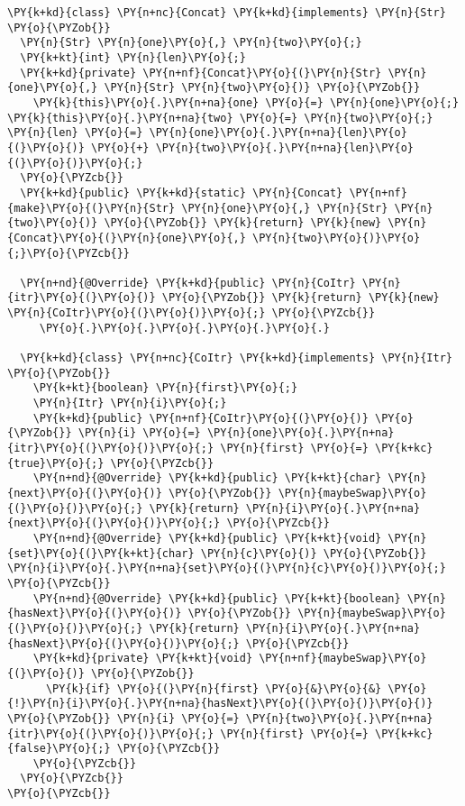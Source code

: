 \begin{Verbatim}[commandchars=\\\{\}]
\PY{k+kd}{class} \PY{n+nc}{Concat} \PY{k+kd}{implements} \PY{n}{Str} \PY{o}{\PYZob{}}
  \PY{n}{Str} \PY{n}{one}\PY{o}{,} \PY{n}{two}\PY{o}{;}
  \PY{k+kt}{int} \PY{n}{len}\PY{o}{;}
  \PY{k+kd}{private} \PY{n+nf}{Concat}\PY{o}{(}\PY{n}{Str} \PY{n}{one}\PY{o}{,} \PY{n}{Str} \PY{n}{two}\PY{o}{)} \PY{o}{\PYZob{}}
    \PY{k}{this}\PY{o}{.}\PY{n+na}{one} \PY{o}{=} \PY{n}{one}\PY{o}{;} \PY{k}{this}\PY{o}{.}\PY{n+na}{two} \PY{o}{=} \PY{n}{two}\PY{o}{;} \PY{n}{len} \PY{o}{=} \PY{n}{one}\PY{o}{.}\PY{n+na}{len}\PY{o}{(}\PY{o}{)} \PY{o}{+} \PY{n}{two}\PY{o}{.}\PY{n+na}{len}\PY{o}{(}\PY{o}{)}\PY{o}{;}
  \PY{o}{\PYZcb{}}
  \PY{k+kd}{public} \PY{k+kd}{static} \PY{n}{Concat} \PY{n+nf}{make}\PY{o}{(}\PY{n}{Str} \PY{n}{one}\PY{o}{,} \PY{n}{Str} \PY{n}{two}\PY{o}{)} \PY{o}{\PYZob{}} \PY{k}{return} \PY{k}{new} \PY{n}{Concat}\PY{o}{(}\PY{n}{one}\PY{o}{,} \PY{n}{two}\PY{o}{)}\PY{o}{;}\PY{o}{\PYZcb{}}

  \PY{n+nd}{@Override} \PY{k+kd}{public} \PY{n}{CoItr} \PY{n}{itr}\PY{o}{(}\PY{o}{)} \PY{o}{\PYZob{}} \PY{k}{return} \PY{k}{new} \PY{n}{CoItr}\PY{o}{(}\PY{o}{)}\PY{o}{;} \PY{o}{\PYZcb{}}
     \PY{o}{.}\PY{o}{.}\PY{o}{.}\PY{o}{.}\PY{o}{.}

  \PY{k+kd}{class} \PY{n+nc}{CoItr} \PY{k+kd}{implements} \PY{n}{Itr} \PY{o}{\PYZob{}}
    \PY{k+kt}{boolean} \PY{n}{first}\PY{o}{;}
    \PY{n}{Itr} \PY{n}{i}\PY{o}{;}
    \PY{k+kd}{public} \PY{n+nf}{CoItr}\PY{o}{(}\PY{o}{)} \PY{o}{\PYZob{}} \PY{n}{i} \PY{o}{=} \PY{n}{one}\PY{o}{.}\PY{n+na}{itr}\PY{o}{(}\PY{o}{)}\PY{o}{;} \PY{n}{first} \PY{o}{=} \PY{k+kc}{true}\PY{o}{;} \PY{o}{\PYZcb{}}
    \PY{n+nd}{@Override} \PY{k+kd}{public} \PY{k+kt}{char} \PY{n}{next}\PY{o}{(}\PY{o}{)} \PY{o}{\PYZob{}} \PY{n}{maybeSwap}\PY{o}{(}\PY{o}{)}\PY{o}{;} \PY{k}{return} \PY{n}{i}\PY{o}{.}\PY{n+na}{next}\PY{o}{(}\PY{o}{)}\PY{o}{;} \PY{o}{\PYZcb{}}
    \PY{n+nd}{@Override} \PY{k+kd}{public} \PY{k+kt}{void} \PY{n}{set}\PY{o}{(}\PY{k+kt}{char} \PY{n}{c}\PY{o}{)} \PY{o}{\PYZob{}} \PY{n}{i}\PY{o}{.}\PY{n+na}{set}\PY{o}{(}\PY{n}{c}\PY{o}{)}\PY{o}{;} \PY{o}{\PYZcb{}}
    \PY{n+nd}{@Override} \PY{k+kd}{public} \PY{k+kt}{boolean} \PY{n}{hasNext}\PY{o}{(}\PY{o}{)} \PY{o}{\PYZob{}} \PY{n}{maybeSwap}\PY{o}{(}\PY{o}{)}\PY{o}{;} \PY{k}{return} \PY{n}{i}\PY{o}{.}\PY{n+na}{hasNext}\PY{o}{(}\PY{o}{)}\PY{o}{;} \PY{o}{\PYZcb{}}
    \PY{k+kd}{private} \PY{k+kt}{void} \PY{n+nf}{maybeSwap}\PY{o}{(}\PY{o}{)} \PY{o}{\PYZob{}}
      \PY{k}{if} \PY{o}{(}\PY{n}{first} \PY{o}{&}\PY{o}{&} \PY{o}{!}\PY{n}{i}\PY{o}{.}\PY{n+na}{hasNext}\PY{o}{(}\PY{o}{)}\PY{o}{)} \PY{o}{\PYZob{}} \PY{n}{i} \PY{o}{=} \PY{n}{two}\PY{o}{.}\PY{n+na}{itr}\PY{o}{(}\PY{o}{)}\PY{o}{;} \PY{n}{first} \PY{o}{=} \PY{k+kc}{false}\PY{o}{;} \PY{o}{\PYZcb{}}
    \PY{o}{\PYZcb{}}
  \PY{o}{\PYZcb{}}
\PY{o}{\PYZcb{}}
\end{Verbatim}
